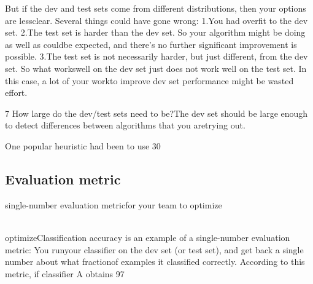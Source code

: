 But  if  the  dev  and  test  sets  come  from  different  distributions,  then  your  options  are  lessclear.  Several  things  could  have  gone  wrong:
1.You  had  overfit  to  the  dev  set.
2.The  test  set  is  harder  than  the  dev  set.  So  your  algorithm  might  be  doing  as  well  as  couldbe  expected,  and  there’s  no  further  significant  improvement  is  possible.
3.The  test  set  is  not  necessarily  harder,  but  just  different, from  the  dev  set.  So  what  workswell  on  the  dev  set  just  does  not  work  well  on  the  test  set.  In  this  case,  a  lot  of  your  workto  improve  dev  set  performance  might  be  wasted  effort.

7  How  large  do  the  dev/test  sets  need  to  be?The  dev  set  should  be  large  enough  to  detect  differences  between  algorithms  that  you  aretrying  out. 

One  popular  heuristic  had  been  to  use  30%

\subsection{Evaluation metric }
\label{subsec:EvaluationMetric}
 single-number  evaluation  metricfor  your  team  to  optimize 
 
 \\
 optimizeClassification  accuracy  is  an  example  of  a  single-number  evaluation  metric​:  You  runyour  classifier  on  the  dev  set  (or  test  set),  and  get  back  a  single  number  about  what  fractionof  examples  it  classified  correctly.  According  to  this  metric,  if  classifier  A  obtains  97%
 
